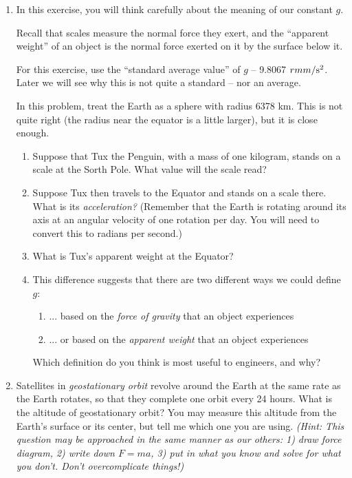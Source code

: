 \documentclass[12pt]{article}
\begin{document}
\begin{enumerate}
\item
{
In this exercise, you will think carefully about the meaning of our constant $g$. 

Recall that scales measure the normal force they exert, and the ``apparent weight'' of an object is the normal force exerted on it by the surface below it.

For this exercise, use the ``standard average value'' of $g$ -- 9.8067 $rm m/\rm s^2$. Later we will see why this is not quite a standard -- nor an average.

In this problem, treat the Earth as a sphere with radius 6378 km. This is not quite right (the radius near the equator is a little larger), but it is close enough.

\begin{enumerate}

\item Suppose that Tux the Penguin, with a mass of one kilogram, stands on a scale at the Sorth Pole. What value will the scale read?
\item Suppose Tux then travels to the Equator and stands on a scale there. What is its {\it acceleration?} (Remember that the Earth is rotating around its axis at an angular velocity of one rotation per day. You will need to convert this to radians per second.)
\item What is Tux's apparent weight at the Equator?
\item {This difference suggests that there are two different ways we could define $g$:
\begin{enumerate}
	\item ... based on the {\it force of gravity} that an object experiences
	\item ... or based on the {\it apparent weight} that an object experiences
\end{enumerate}
   Which definition do you think is most useful to engineers, and why?
}


\end{enumerate}

}

\item Satellites in {\it geostationary orbit} revolve around the Earth at the same rate as the Earth rotates, so that they complete one orbit every 24 hours. What is the altitude of geostationary orbit? You may measure this altitude from the Earth's surface or its center, but tell me which one you are using. {\it (Hint: This question may be approached in the same manner as our others: 1) draw force diagram, 2) write down $F=ma$, 3) put in what you know and solve for what you don't. Don't overcomplicate things!)}




\end{enumerate}
\end{document}
